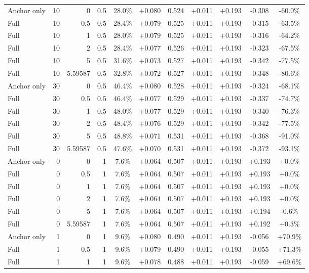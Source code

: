 \begin{table}[htbp]
\begin{tabular}{lrrrccccccc}
Anchor only & 10 & 0 & 0.5 & 28.0\% & +0.080 & 0.524 & +0.011 & +0.193 & -0.308 & -60.0\% \\
Full & 10 & 0.5 & 0.5 & 28.4\% & +0.079 & 0.525 & +0.011 & +0.193 & -0.315 & -63.5\% \\
Full & 10 & 1 & 0.5 & 28.0\% & +0.079 & 0.525 & +0.011 & +0.193 & -0.316 & -64.2\% \\
Full & 10 & 2 & 0.5 & 28.4\% & +0.077 & 0.526 & +0.011 & +0.193 & -0.323 & -67.5\% \\
Full & 10 & 5 & 0.5 & 31.6\% & +0.073 & 0.527 & +0.011 & +0.193 & -0.342 & -77.5\% \\
Full & 10 & 5.59587 & 0.5 & 32.8\% & +0.072 & 0.527 & +0.011 & +0.193 & -0.348 & -80.6\% \\
Anchor only & 30 & 0 & 0.5 & 46.4\% & +0.080 & 0.528 & +0.011 & +0.193 & -0.324 & -68.1\% \\
Full & 30 & 0.5 & 0.5 & 46.4\% & +0.077 & 0.529 & +0.011 & +0.193 & -0.337 & -74.7\% \\
Full & 30 & 1 & 0.5 & 48.0\% & +0.077 & 0.529 & +0.011 & +0.193 & -0.340 & -76.3\% \\
Full & 30 & 2 & 0.5 & 48.4\% & +0.076 & 0.529 & +0.011 & +0.193 & -0.342 & -77.5\% \\
Full & 30 & 5 & 0.5 & 48.8\% & +0.071 & 0.531 & +0.011 & +0.193 & -0.368 & -91.0\% \\
Full & 30 & 5.59587 & 0.5 & 47.6\% & +0.070 & 0.531 & +0.011 & +0.193 & -0.372 & -93.1\% \\
Anchor only & 0 & 0 & 1 & 7.6\% & +0.064 & 0.507 & +0.011 & +0.193 & +0.193 & +0.0\% \\
Full & 0 & 0.5 & 1 & 7.6\% & +0.064 & 0.507 & +0.011 & +0.193 & +0.193 & +0.0\% \\
Full & 0 & 1 & 1 & 7.6\% & +0.064 & 0.507 & +0.011 & +0.193 & +0.193 & +0.0\% \\
Full & 0 & 2 & 1 & 7.6\% & +0.064 & 0.507 & +0.011 & +0.193 & +0.193 & +0.0\% \\
Full & 0 & 5 & 1 & 7.6\% & +0.064 & 0.507 & +0.011 & +0.193 & +0.194 & -0.6\% \\
Full & 0 & 5.59587 & 1 & 7.6\% & +0.064 & 0.507 & +0.011 & +0.193 & +0.192 & +0.3\% \\
Anchor only & 1 & 0 & 1 & 9.6\% & +0.080 & 0.490 & +0.011 & +0.193 & -0.056 & +70.9\% \\
Full & 1 & 0.5 & 1 & 9.6\% & +0.079 & 0.490 & +0.011 & +0.193 & -0.055 & +71.3\% \\
Full & 1 & 1 & 1 & 9.6\% & +0.078 & 0.488 & +0.011 & +0.193 & -0.059 & +69.6\% \\

\end{tabular}
\end{table}
